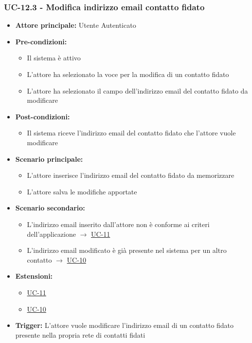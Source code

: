 \documentclass[a4paper,12pt]{article}
\begin{document}
\subsubsection{UC-12.3 - Modifica indirizzo email contatto fidato} \label{subsec:UC-12.3}
\begin{itemize}
    \item \textbf{Attore principale:} Utente Autenticato
    \item \textbf{Pre-condizioni:}
    \begin{itemize}
        \item Il sistema è attivo
        \item L'attore ha selezionato la voce per la modifica di un contatto fidato
        \item L'attore ha selezionato il campo dell'indirizzo email del contatto fidato da modificare
    \end{itemize}
    \item \textbf{Post-condizioni:} 
    \begin{itemize}
        \item Il sistema riceve l'indirizzo email del contatto fidato che l'attore vuole modificare
    \end{itemize}
    \item \textbf{Scenario principale:} 
    \begin{itemize}
        \item L'attore inserisce l'indirizzo email del contatto fidato da memorizzare
        \item L'attore salva le modifiche apportate
    \end{itemize}
    \item \textbf{Scenario secondario:}
    \begin{itemize}
        \item L'indirizzo email inserito dall'attore non è conforme ai criteri dell'applicazione $\rightarrow$ \hyperref[subsec:UC-11]{UC-11}
        \item L'indirizzo email modificato è già presente nel sistema per un altro contatto $\rightarrow$ \hyperref[subsec:UC-10]{UC-10}
    \end{itemize}
    \item \textbf{Estensioni:}
    \begin{itemize}
        \item \hyperref[subsec:UC-11]{UC-11}
        \item \hyperref[subsec:UC-10]{UC-10}
    \end{itemize}
    \item \textbf{Trigger:} L'attore vuole modificare l'indirizzo email di un contatto fidato presente nella propria rete di contatti fidati
\end{itemize}
\end{document}
